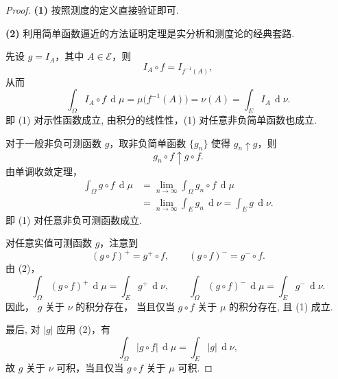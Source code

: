         \begin{proof}
            \textbf{(1)}
            按照测度的定义直接验证即可. 

            \textbf{(2)}
            利用简单函数逼近的方法证明定理是实分析和测度论的经典套路.

            先设 $g=I_A$，其中 $A\in\mathcal{E}$，则
            \[
                I_A\circ f=I_{f^{-1}(A)},
            \]
            从而
            \[
                \int_\Omega I_A\circ f\,\operatorname d\!\mu
                =\mu\bigl(f^{-1}(A)\bigr)
                =\nu(A)
                =\int_E I_A\,\operatorname d\!\nu.
            \]
            即 (1) 对示性函数成立, 
            由积分的线性性，(1) 对任意非负简单函数也成立.

            对于一般非负可测函数 $g$，取非负简单函数
            $\{g_n\}$ 使得 $g_n\uparrow g$，则
            \[
                g_n\circ f\uparrow g\circ f.
            \]
            由单调收敛定理，
            \[
            \begin{aligned}
                \int_\Omega g\circ f\,\operatorname d\!\mu
                &=\lim_{n\to\infty}\int_\Omega g_n\circ f\,\operatorname d\!\mu\\
                &=\lim_{n\to\infty}\int_E g_n\,\operatorname d\!\nu
                =\int_E g\,\operatorname d\!\nu.
            \end{aligned}
            \tag{2}
            \]
            即 (1) 对任意非负可测函数成立. 

            对任意实值可测函数 $g$，注意到
            \[
                (g\circ f)^+=g^+\circ f,
                \qquad
                (g\circ f)^-=g^-\circ f.
            \]
            由 (2)，
            \[
                \int_\Omega(g\circ f)^+\,\operatorname d\!\mu
                =\int_Eg^+\,\operatorname d\!\nu,
                \qquad
                \int_\Omega(g\circ f)^-\,\operatorname d\!\mu
                =\int_Eg^-\,\operatorname d\!\nu.
            \]
            因此，
            $g$ 关于 $\nu$ 的积分存在，
            当且仅当 $g\circ f$ 关于 $\mu$ 的积分存在, 且 (1) 成立. 

            最后, 对 $|g|$ 应用 (2)，有
            \[
                \int_\Omega|g\circ f|\,\operatorname d\!\mu
                =\int_E|g|\,\operatorname d\!\nu,
            \]
            故 $g$ 关于 $\nu$ 可积，当且仅当 $g\circ f$ 关于 $\mu$ 可积.


\end{proof}
